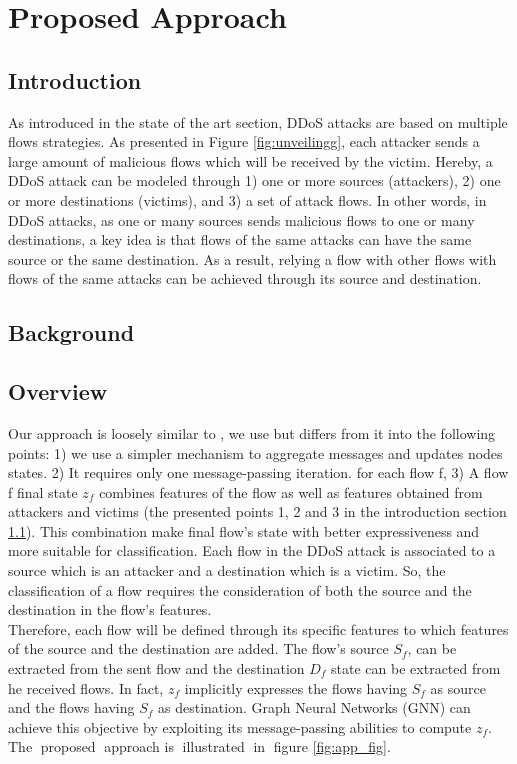 \chapter{Proposed Approach}
\label{chapter:approach}




\section{Introduction}
\label{section:ApproachIntroduction}
As introduced in the state of the art section,  DDoS attacks are based on multiple flows strategies. As presented in Figure \ref{fig:unveilingg}, each attacker sends a large amount of malicious flows which will be received by the victim. Hereby, a DDoS attack can be modeled through 1) one or more sources (attackers), 2) one or more destinations (victims), and 3) a set of attack flows. In other words, in DDoS attacks, as one or many sources sends malicious flows to one or many destinations, a key idea is that flows of the same attacks can have the same source or the same destination. As a result, relying a flow with other flows with flows of the same attacks can be achieved through its source and destination.\\


\section{Background}

\section{Overview}
\label{overviw}
 Our approach is loosely similar to \cite{unveiling}, we use but differs from it into the following points: 1) we use a simpler mechanism to aggregate messages and updates nodes states. 2) It requires only one message-passing iteration. for each flow f, 3) A flow f final state $z_f$ combines features of the flow as well as features obtained from attackers and victims (the presented points 1, 2 and 3 in the introduction section \ref{section:ApproachIntroduction}). This combination make final flow's state with better expressiveness and more suitable for classification. Each flow in the DDoS attack is associated to a source which is an attacker and a destination which is a victim. So, the classification of a flow requires the consideration of both the source and the destination in the flow's features.  \\
Therefore, each flow will be defined through its specific features to which features of the source and the destination are added.  
The flow's source $S_f$, can be extracted from the sent flow and the destination $D_f$ state can be extracted from he received flows. In fact, $z_f$ implicitly expresses the flows having $S_f$ as source and the flows having $S_f$ as destination. Graph Neural Networks (GNN) can achieve this objective by exploiting its message-passing abilities to compute $z_f$. The\textcolor{white}{.} proposed\textcolor{white}{.} approach is\textcolor{white}{.} illustrated\textcolor{white}{.} in\textcolor{white}{.} figure \ref{fig:app_fig}.

